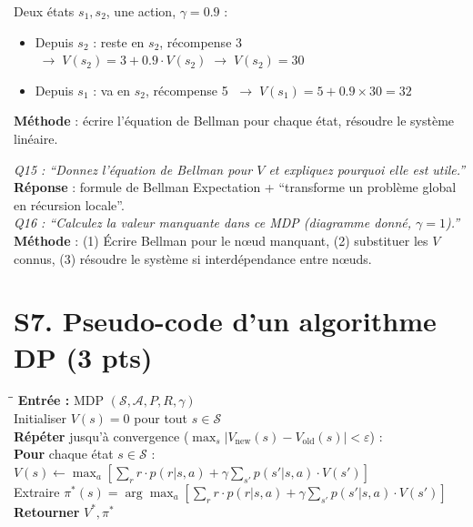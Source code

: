 \documentclass[11pt,a4paper]{article}
\begin{document}
\begin{formbox}
Deux états $s_1, s_2$, une action, $\gamma = 0.9$ :
\begin{itemize}[nosep]
\item Depuis $s_2$ : reste en $s_2$, récompense 3 $\;\to\; V(s_2) = 3 + 0.9 \cdot V(s_2) \;\to\; V(s_2) = 30$
\item Depuis $s_1$ : va en $s_2$, récompense 5 $\;\to\; V(s_1) = 5 + 0.9 \times 30 = 32$
\end{itemize}
\textbf{Méthode} : écrire l'équation de Bellman pour chaque état, résoudre le système linéaire.
\end{formbox}

\begin{exambox}
\textit{Q15 : ``Donnez l'équation de Bellman pour $V$ et expliquez pourquoi elle est utile.''}\\
\textbf{Réponse} : formule de Bellman Expectation + ``transforme un problème global en récursion locale''.\\[6pt]
\textit{Q16 : ``Calculez la valeur manquante dans ce MDP (diagramme donné, $\gamma=1$).''}\\
\textbf{Méthode} : (1) Écrire Bellman pour le n\oe{}ud manquant, (2) substituer les $V$ connus, (3) résoudre le système si interdépendance entre n\oe{}uds.
\end{exambox}

\section{S7. Pseudo-code d'un algorithme DP (3 pts)}

\begin{formbox}
{\ttfamily
\begin{tabbing}
\hspace{6mm}\=\hspace{6mm}\=\kill
\textbf{Entrée :} MDP $(\mathcal{S}, \mathcal{A}, P, R, \gamma)$\\
Initialiser $V(s) = 0$ pour tout $s \in \mathcal{S}$\\[2pt]
\textbf{Répéter} jusqu'à convergence ($\max_s |V_{\text{new}}(s) - V_{\text{old}}(s)| < \varepsilon$) :\\
\> \textbf{Pour} chaque état $s \in \mathcal{S}$ :\\
\>\> $V(s) \leftarrow \max_a \left[\sum_r r \cdot p(r|s,a) + \gamma \sum_{s'} p(s'|s,a) \cdot V(s')\right]$\\[4pt]
Extraire $\pi^*(s) = \arg\max_a \left[\sum_r r \cdot p(r|s,a) + \gamma \sum_{s'} p(s'|s,a) \cdot V(s')\right]$\\
\textbf{Retourner} $V^*, \pi^*$
\end{tabbing}}
\end{formbox}
\end{document}
